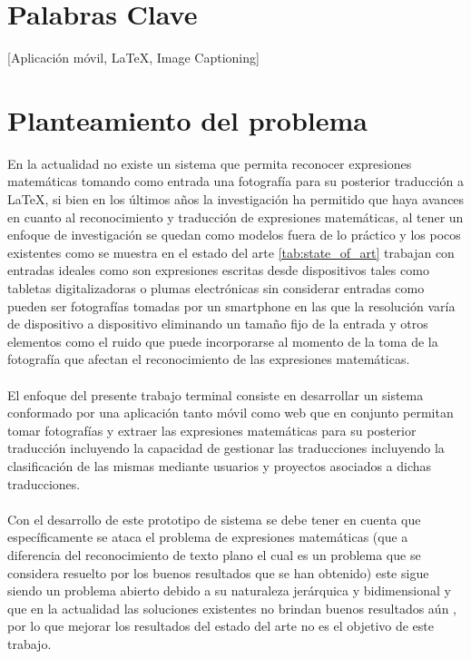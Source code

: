 \section{Palabras Clave}
[Aplicación móvil, LaTeX, Image Captioning] %
\newpage
\section{Planteamiento del problema}
En la actualidad no existe un sistema que permita reconocer expresiones matemáticas tomando como entrada una fotografía para su posterior traducción a LaTeX, si bien en los últimos años la investigación ha permitido que haya avances en cuanto al reconocimiento y traducción de expresiones matemáticas, al tener un enfoque de investigación se quedan como modelos fuera de lo práctico y los pocos existentes como se muestra en el estado del arte \ref{tab:state_of_art} trabajan con entradas ideales como son expresiones escritas desde dispositivos tales como tabletas digitalizadoras o plumas electrónicas sin considerar entradas como pueden ser fotografías tomadas por un smartphone en las que la resolución varía de dispositivo a dispositivo eliminando un tamaño fijo de la entrada y otros elementos como el ruido que puede incorporarse al momento de la toma de la fotografía que afectan el reconocimiento de las expresiones matemáticas.
\\\\


El enfoque del presente trabajo terminal consiste en desarrollar un sistema conformado por una aplicación tanto móvil como web que en conjunto permitan tomar fotografías y extraer las expresiones matemáticas para su posterior traducción incluyendo la capacidad de gestionar las traducciones incluyendo la clasificación de las mismas mediante usuarios y proyectos asociados a dichas traducciones.
\\\\%

Con el desarrollo de este prototipo de sistema se debe tener en cuenta que específicamente se ataca el problema de expresiones matemáticas (que a diferencia del reconocimiento de texto plano el cual es un problema que se considera resuelto por los buenos resultados que se han obtenido) este sigue siendo un problema abierto debido a su naturaleza jerárquica y bidimensional y que en la actualidad las soluciones existentes no brindan buenos resultados aún \cite{chino}, por lo que mejorar los resultados del estado del arte no es el objetivo de este trabajo.


